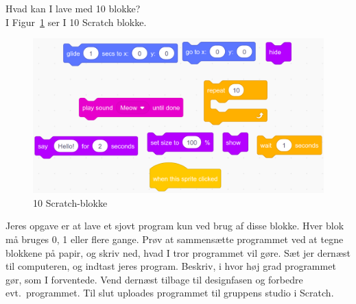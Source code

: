 Hvad kan I lave med 10 blokke?\\
I Figur~\ref{fig:blokke} ser I 10 Scratch blokke.
\begin{figure}
  \centering
  \includegraphics[width=0.9\linewidth]{figures/Scratch3.png}
  \caption{10 Scratch-blokke}
  \label{fig:blokke}
\end{figure}
Jeres opgave er at lave et sjovt program kun ved brug af disse blokke. Hver blok må bruges 0, 1 eller flere gange. Prøv at sammensætte programmet ved at tegne blokkene på papir, og skriv ned, hvad I tror programmet vil gøre. Sæt jer dernæst til computeren, og indtast jeres program. Beskriv, i hvor høj grad programmet gør, som I forventede. Vend dernæst tilbage til designfasen og forbedre evt.\ programmet. Til slut uploades programmet til gruppens studio i Scratch.
